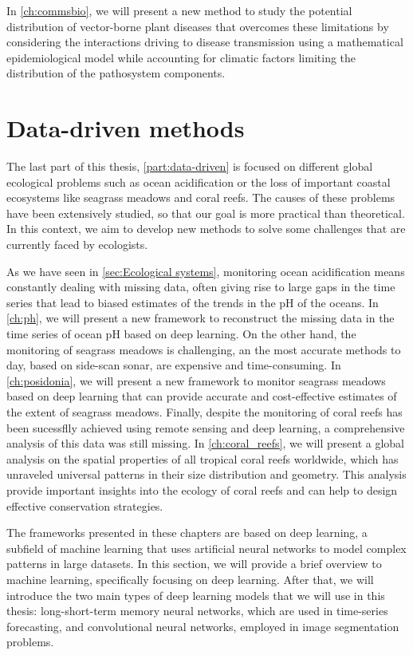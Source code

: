 In \cref{ch:commsbio}, we will present a new method to study the potential
distribution of vector-borne plant diseases that overcomes these limitations by
considering the interactions driving to disease transmission using a
mathematical epidemiological model while accounting for climatic factors
limiting the distribution of the pathosystem components.

\section{\label{sec:Data-driven methods} Data-driven methods}

The last part of this thesis, \cref{part:data-driven} is focused on different
global ecological problems such as ocean acidification or the loss of important
coastal ecosystems like seagrass meadows and coral reefs. The causes of
these problems have been extensively studied, so that our goal is more
practical than theoretical. In this context, we aim to develop new methods to
solve some challenges that are currently faced by ecologists.

As we have seen in \cref{sec:Ecological systems}, monitoring ocean
acidification means constantly dealing with missing data, often giving rise to
large gaps in the time series that lead to biased estimates of the trends in
the pH of the oceans. In \cref{ch:ph}, we will present a new framework to
reconstruct the missing data in the time series of ocean pH based on deep
learning. On the other hand, the monitoring of seagrass meadows is challenging,
an the most accurate methods to day, based on side-scan sonar, are expensive
and time-consuming. In \cref{ch:posidonia}, we will present a new framework to
monitor seagrass meadows based on deep learning that can provide accurate and
cost-effective estimates of the extent of seagrass meadows. Finally, despite
the monitoring of coral reefs has been sucessflly achieved using remote sensing
and deep learning, a comprehensive analysis of this data was still missing.
In \cref{ch:coral_reefs}, we will present a global analysis on the spatial
properties of all tropical coral reefs worldwide, which has unraveled universal
patterns in their size distribution and geometry. This analysis provide
important insights into the ecology of coral reefs and can help to design
effective conservation strategies.

The frameworks presented in these chapters are based on deep learning, a
subfield of machine learning that uses artificial neural networks to model
complex patterns in large datasets. In this section, we will provide a brief
overview to machine learning, specifically focusing on deep learning. After
that, we will introduce the two main types of deep learning models that we will
use in this thesis: long-short-term memory neural networks, which are used in
time-series forecasting, and convolutional neural networks, employed in image
segmentation problems.

